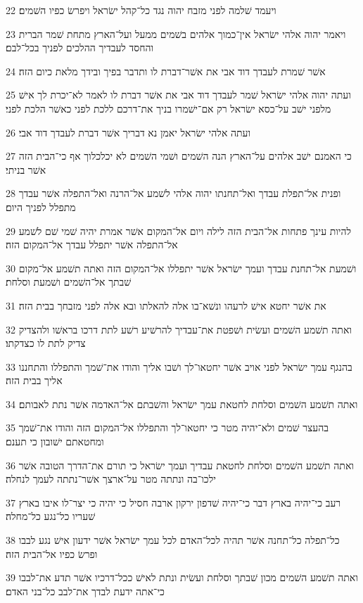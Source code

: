 \par 22 ויעמד שׁלמה לפני מזבח יהוה נגד כל־קהל ישׂראל ויפרשׂ כפיו השׁמים׃
\par 23 ויאמר יהוה אלהי ישׂראל אין־כמוך אלהים בשׁמים ממעל ועל־הארץ מתחת שׁמר הברית והחסד לעבדיך ההלכים לפניך בכל־לבם׃
\par 24 אשׁר שׁמרת לעבדך דוד אבי את אשׁר־דברת לו ותדבר בפיך ובידך מלאת כיום הזה׃
\par 25 ועתה יהוה אלהי ישׂראל שׁמר לעבדך דוד אבי את אשׁר דברת לו לאמר לא־יכרת לך אישׁ מלפני ישׁב על־כסא ישׂראל רק אם־ישׁמרו בניך את־דרכם ללכת לפני כאשׁר הלכת לפני׃
\par 26 ועתה אלהי ישׂראל יאמן נא דבריך אשׁר דברת לעבדך דוד אבי׃
\par 27 כי האמנם ישׁב אלהים על־הארץ הנה השׁמים ושׁמי השׁמים לא יכלכלוך אף כי־הבית הזה אשׁר בניתי׃
\par 28 ופנית אל־תפלת עבדך ואל־תחנתו יהוה אלהי לשׁמע אל־הרנה ואל־התפלה אשׁר עבדך מתפלל לפניך היום׃
\par 29 להיות עינך פתחות אל־הבית הזה לילה ויום אל־המקום אשׁר אמרת יהיה שׁמי שׁם לשׁמע אל־התפלה אשׁר יתפלל עבדך אל־המקום הזה׃
\par 30 ושׁמעת אל־תחנת עבדך ועמך ישׂראל אשׁר יתפללו אל־המקום הזה ואתה תשׁמע אל־מקום שׁבתך אל־השׁמים ושׁמעת וסלחת׃
\par 31 את אשׁר יחטא אישׁ לרעהו ונשׁא־בו אלה להאלתו ובא אלה לפני מזבחך בבית הזה׃
\par 32 ואתה תשׁמע השׁמים ועשׂית ושׁפטת את־עבדיך להרשׁיע רשׁע לתת דרכו בראשׁו ולהצדיק צדיק לתת לו כצדקתו׃
\par 33 בהנגף עמך ישׂראל לפני אויב אשׁר יחטאו־לך ושׁבו אליך והודו את־שׁמך והתפללו והתחננו אליך בבית הזה׃
\par 34 ואתה תשׁמע השׁמים וסלחת לחטאת עמך ישׂראל והשׁבתם אל־האדמה אשׁר נתת לאבותם׃
\par 35 בהעצר שׁמים ולא־יהיה מטר כי יחטאו־לך והתפללו אל־המקום הזה והודו את־שׁמך ומחטאתם ישׁובון כי תענם׃
\par 36 ואתה תשׁמע השׁמים וסלחת לחטאת עבדיך ועמך ישׂראל כי תורם את־הדרך הטובה אשׁר ילכו־בה ונתתה מטר על־ארצך אשׁר־נתתה לעמך לנחלה׃
\par 37 רעב כי־יהיה בארץ דבר כי־יהיה שׁדפון ירקון ארבה חסיל כי יהיה כי יצר־לו איבו בארץ שׁעריו כל־נגע כל־מחלה׃
\par 38 כל־תפלה כל־תחנה אשׁר תהיה לכל־האדם לכל עמך ישׂראל אשׁר ידעון אישׁ נגע לבבו ופרשׂ כפיו אל־הבית הזה׃
\par 39 ואתה תשׁמע השׁמים מכון שׁבתך וסלחת ועשׂית ונתת לאישׁ ככל־דרכיו אשׁר תדע את־לבבו כי־אתה ידעת לבדך את־לבב כל־בני האדם׃
